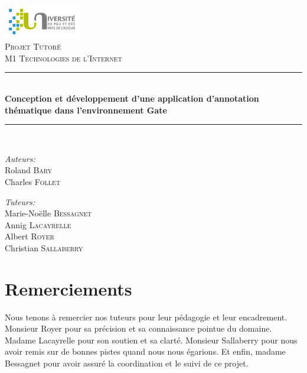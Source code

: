 \documentclass[a4paper, 11pt]{report}
\newcommand{\HRule}{\rule{\linewidth}{0.5mm}}
\begin{document}
\author{Charles Follet \and Roland Bary}

\begin{titlepage}
\begin{center}

\includegraphics[width=0.25\textwidth]{./logo.png}~\\[1cm]

\textsc{\Large Projet Tutoré}\\[0.5cm]
\textsc{\Large M1 Technologies de l'Internet}\\[0.5cm]

\HRule \\[0.4cm]
{ \LARGE \bfseries Conception et développement d’une application d’annotation thématique dans
l'environnement Gate \\[0.4cm] }

\HRule \\[1.5cm]

\noindent
\begin{minipage}[t]{0.4\textwidth}
\begin{flushleft} \large
\emph{Auteurs:}\\
Roland \textsc{Bary}\\
Charles \textsc{Follet}
\end{flushleft}
\end{minipage}%
\begin{minipage}[t]{0.4\textwidth}
\begin{flushright} \large
\emph{Tuteurs:} \\
Marie-Noëlle \textsc{Bessagnet}\\
Annig \textsc{Lacayrelle}\\
Albert \textsc{Royer}\\
Christian \textsc{Sallaberry}
\end{flushright}
\end{minipage}

\vfill

{\large \date{}}

\end{center}
\end{titlepage}
\section*{Remerciements}
Nous tenons à remercier nos tuteurs pour leur pédagogie et leur encadrement. Monsieur Royer pour sa précision et sa connaissance pointue du domaine. Madame Lacayrelle pour son soutien et sa clarté. Monsieur Sallaberry pour nous avoir remis sur de bonnes pistes quand nous nous égarions. Et enfin, madame Bessagnet pour avoir assuré la coordination et le suivi de ce projet.
\tableofcontents
\end{document}
